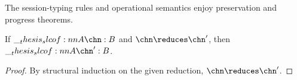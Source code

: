 
The session-typing rules and operational semantics enjoy preservation and progress theorems.

\begin{theorem}[Preservation]
  If $\slcof{A |- \chn : B}$ and $\chn \reduces \chn'$, then $\slcof{A |- \chn' : B}$.
\end{theorem}
\begin{proof}
  By structural induction on the given reduction, $\chn \reduces \chn'$.
\end{proof}

